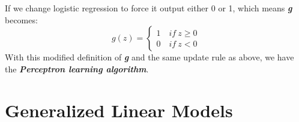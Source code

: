 \documentclass{article}
\begin{document}
If we change logistic regression to force it output either 0 or 1, which means \emph{\textbf{g}} becomes:
\begin{equation*}
g(z)=\begin{cases}
     1 \quad if \ z\geq 0 \\
     0 \quad if \ z<0
     \end{cases}
\end{equation*}
With this modified definition of \emph{\textbf{g}} and the same update rule as above, we have the \emph{\textbf{Perceptron learning algorithm}}.

\section{Generalized Linear Models}
\end{document}
